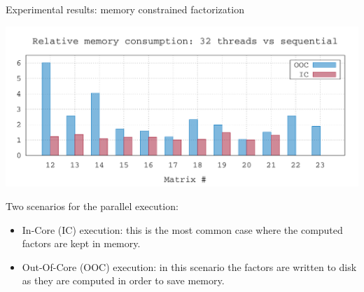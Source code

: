 \begin{frame}{Experimental results: memory constrained factorization}

  \begin{center}
    \includegraphics[width=\textwidth]{data/relative_mem2}
  \end{center}
  
  Two scenarios for the parallel execution:
  \begin{itemize}
  \item In-Core (IC) execution: this is the most common case where the
    computed factors are kept in memory.
  \item Out-Of-Core (OOC) execution: in this scenario the factors are
    written to disk as they are computed in order to save memory.
  \end{itemize}

\end{frame}

